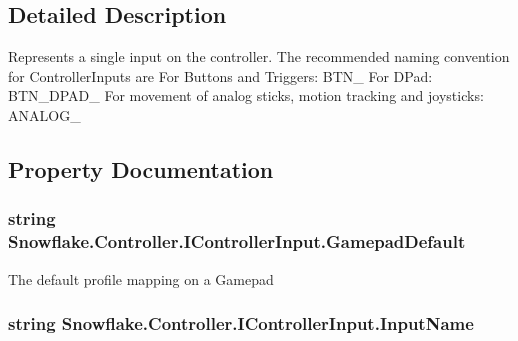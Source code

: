 \subsection{Detailed Description}
Represents a single input on the controller. The recommended naming convention for Controller\+Inputs are For Buttons and Triggers\+: B\+T\+N\+\_\+ For D\+Pad\+: B\+T\+N\+\_\+\+D\+P\+A\+D\+\_\+ For movement of analog sticks, motion tracking and joysticks\+: A\+N\+A\+L\+O\+G\+\_\+ 



\subsection{Property Documentation}
\hypertarget{interface_snowflake_1_1_controller_1_1_i_controller_input_af599b54bfd5d01c182b8fa10f0918ee8}{}
\subsubsection[{Gamepad\+Default}]{\setlength{\rightskip}{0pt plus 5cm}string Snowflake.\+Controller.\+I\+Controller\+Input.\+Gamepad\+Default\hspace{0.3cm}{\ttfamily [get]}}\label{interface_snowflake_1_1_controller_1_1_i_controller_input_af599b54bfd5d01c182b8fa10f0918ee8}


The default profile mapping on a Gamepad 

\hypertarget{interface_snowflake_1_1_controller_1_1_i_controller_input_aee56ea454294051639b2d30948a9cab5}{}
\subsubsection[{Input\+Name}]{\setlength{\rightskip}{0pt plus 5cm}string Snowflake.\+Controller.\+I\+Controller\+Input.\+Input\+Name\hspace{0.3cm}{\ttfamily [get]}}\label{interface_snowflake_1_1_controller_1_1_i_controller_input_aee56ea454294051639b2d30948a9cab5}


